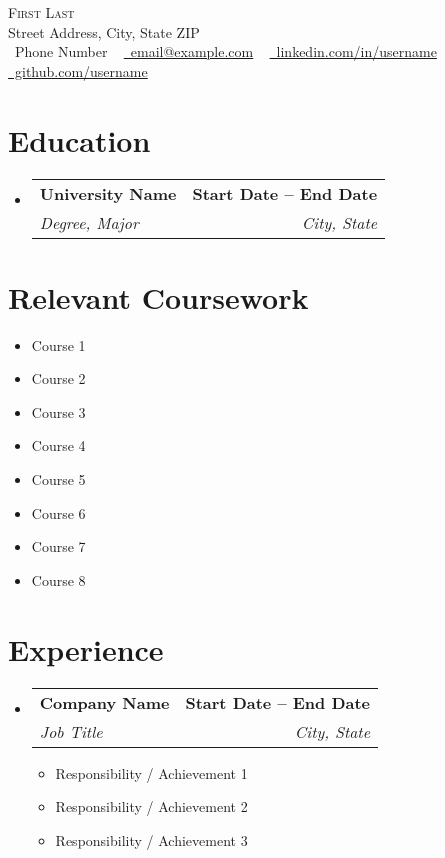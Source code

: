 \documentclass[letterpaper,11pt]{article}
\makeatletter
\newcommand{\resumeItem}[1]{\item\small{#1 \vspace{-2pt}}}
\newcommand{\resumeSubheading}[4]{
  \vspace{-2pt}\item
  \begin{tabular*}{1.0\textwidth}[t]{l@{\extracolsep{\fill}}r}
    \textbf{#1} & \textbf{\small #2} \\
    \textit{\small#3} & \textit{\small #4} \\
  \end{tabular*}\vspace{-7pt}
}
\newcommand{\resumeItemListStart}{\begin{itemize}}
\newcommand{\resumeItemListEnd}{\end{itemize}\vspace{-5pt}}
\newcommand{\resumeSubHeadingListStart}{\begin{itemize}[leftmargin=0.0in, label={}]}
\newcommand{\resumeSubHeadingListEnd}{\end{itemize}}
\makeatother
\begin{document}
\begin{center}
    {\Huge \scshape First Last} \\ \vspace{1pt}
    Street Address, City, State ZIP \\ \vspace{1pt}
    \small \raisebox{-0.1\height}\faPhone\ Phone Number ~ 
    \href{mailto:email@example.com}{\raisebox{-0.2\height}\faEnvelope\ email@example.com} ~
    \href{https://linkedin.com/in/username}{\raisebox{-0.2\height}\faLinkedin\ linkedin.com/in/username} ~
    \href{https://github.com/username}{\raisebox{-0.2\height}\faGithub\ github.com/username}
\end{center}

\section{Education}
\resumeSubHeadingListStart
  \resumeSubheading
    {University Name}{Start Date -- End Date}
    {Degree, Major}{City, State}
\resumeSubHeadingListEnd

\section{Relevant Coursework}
\begin{multicols}{4}
    \begin{itemize}[itemsep=-5pt, parsep=3pt]
        \item Course 1
        \item Course 2
        \item Course 3
        \item Course 4
        \item Course 5
        \item Course 6
        \item Course 7
        \item Course 8
    \end{itemize}
\end{multicols}

\section{Experience}
\resumeSubHeadingListStart
  \resumeSubheading
    {Company Name}{Start Date -- End Date}
    {Job Title}{City, State}
    \resumeItemListStart
        \resumeItem{Responsibility / Achievement 1}
        \resumeItem{Responsibility / Achievement 2}
        \resumeItem{Responsibility / Achievement 3}
    \resumeItemListEnd
\resumeSubHeadingListEnd
\end{document}
